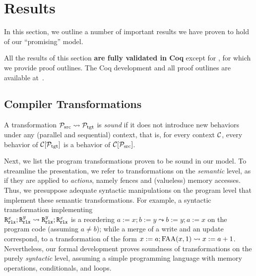 \section{Results}
\label{sec:results}

In this section, we outline a number of important results we have
proven to hold of our ``promising'' model.


All the results of this section \textbf{are fully validated in Coq}
except for %
, for which we provide proof outlines.
The {Coq} development and all proof outlines are available at~\cite{kang-phd-thesis-web}.

\subsection{Compiler Transformations}
\label{sec:transformations}

A transformation $\mathcal{P}_\text{src} \leadsto \mathcal{P}_\text{tgt}$ is \emph{sound} 
if it does not introduce new behaviors under any (parallel and sequential) context, that is, 
for every context ${\cal C}$,
every behavior of ${\cal C}[\mathcal{P}_\text{tgt}]$ is a behavior of ${\cal C}[\mathcal{P}_\text{src}]$.

Next, we list the program transformations proven to be sound in our model.
To streamline the presentation, we refer to transformations on the \emph{semantic} level, 
as if they are applied to \emph{actions}, namely fences and (valueless) memory accesses.
Thus, we presuppose adequate syntactic manipulations on the program level
that implement these semantic transformations.
For example, a syntactic transformation implementing \\
${\texttt{R}^x_{\texttt{rlx}};\texttt{R}^y_{\texttt{rlx}} \leadsto \texttt{R}^y_{\texttt{rlx}};\texttt{R}^x_{\texttt{rlx}}}$
is a reordering ${a:=x; b:=y \leadsto b:=y; a:=x}$
on the program code (assuming $a \neq b$);
while a merge of a write and an update correspond, \eg  to a transformation
of the form $x:=a;\textrm{FAA}({x,1})  \leadsto  x:=a+1$.
Nevertheless, our formal development
proves soundness of transformations on the purely \emph{syntactic} level, assuming a simple programming language with memory operations, conditionals, and loops.



